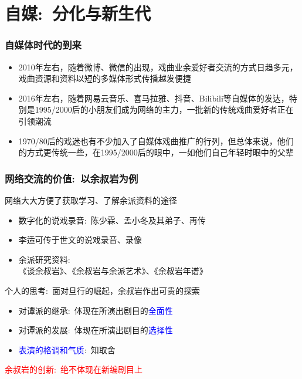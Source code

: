 \documentclass[cjk,slidestop,compress,mathserif,blue]{beamer}
\begin{document}

\section{自媒:~分化与新生代}
\frame
{
	\frametitle{自媒体时代的到来}
	\begin{itemize}
                \setlength{\itemsep}{20pt}
		\item \textrm{2010}年左右，随着微博、微信的出现，戏曲业余爱好者交流的方式日趋多元，戏曲资源和资料以短的多媒体形式传播越发便捷
		\item \textrm{2016}年左右，随着网易云音乐、喜马拉雅、抖音、\textrm{Bilibili}等自媒体的发达，特别是\textrm{1995/2000}后的小朋友们成为网络的主力，一批新的传统戏曲爱好者正在引领潮流
		\item \textrm{1970/80}后的戏迷也有不少加入了自媒体戏曲推广的行列，但总体来说，他们的方式更传统一些，在\textrm{1995/2000}后的眼中，一如他们自己年轻时眼中的父辈
	\end{itemize}
}

\frame
{
	\frametitle{网络交流的价值:~以余叔岩为例}
网络大大方便了获取学习、了解余派资料的途径
\begin{itemize}
	\item 数字化的说戏录音:~陈少霖、孟小冬及其弟子、再传
	\item 李适可传于世文的说戏录音、录像
	\item 余派研究资料:\\
		《谈余叔岩》、《余叔岩与余派艺术》、《余叔岩年谱》
\end{itemize}
\vskip 3pt
个人的思考:~面对旦行的崛起，余叔岩作出可贵的探索
\begin{itemize}
	\item 对谭派的继承:~体现在所演出剧目的\textcolor{blue}{全面性}
	\item 对谭派的发展:~体现在所演出剧目的\textcolor{blue}{选择性}
	\item \textcolor{blue}{表演的格调和气质}:~知取舍
\end{itemize}
\vskip 5pt
\textcolor{red}{余叔岩的创新:~绝不体现在新编剧目上}
}
\end{document}
